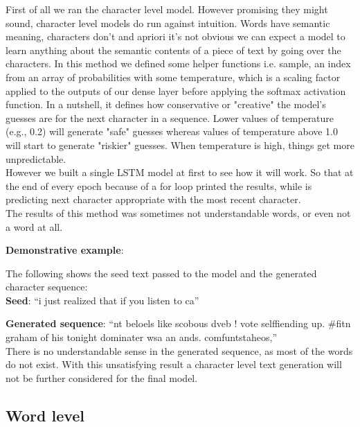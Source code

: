 \documentclass[hidelinks, conference]{IEEEtran}
\begin{document}
First of all we ran the character level model. However promising they might sound, character level models do run against intuition. Words have semantic meaning, characters don't and apriori it's not obvious we can expect a model to learn anything about the semantic contents of a piece of text by going over the characters. In this method we defined some helper functions i.e. sample, an index from an array of probabilities with some temperature, which is a scaling factor applied to the outputs of our dense layer before applying the softmax activation function. In a nutshell, it defines how conservative or "creative" the model's guesses are for the next character in a sequence. Lower values of temperature (e.g., 0.2) will generate "safe" guesses whereas values of temperature above 1.0 will start to generate "riskier" guesses. When temperature is high, things get more unpredictable.\\
However we built a single LSTM model at first to see how it will work. So that at the end of every epoch because of a for loop printed the results, while is predicting next character appropriate with the most recent character.\\
The results of this method was sometimes not understandable words, or even not a word at all.

\textbf{Demonstrative example}:

The following shows the seed text passed to the model and the generated character sequence:\\

\textbf{Seed}: ``i just realized that if you listen to ca''

\textbf{Generated sequence}: ``nt beloels like scobous dveb ! vote selffiending up. \#fitn graham of his tonight dominater wsa an ands. comfuntstaheos,''\\

There is no understandable sense in the generated sequence, as most of the words do not exist. With this unsatisfying result a character level text generation will not be further considered for the final model.

\subsection{Word level}
\end{document}
